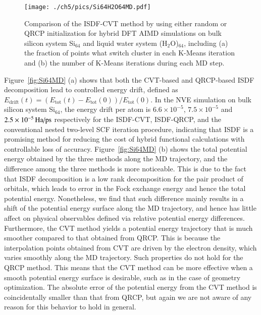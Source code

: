 \begin{figure}[htbp]
	\begin{center}
		\texttt{[image: ./ch5/pics/Si64H2O64MD.pdf]}
	\end{center}
	\caption{Comparison of the ISDF-CVT method by using either random or
	QRCP initialization for hybrid DFT AIMD simulations on bulk silicon
	system Si$_{64}$ and liquid water system (H$_2$O)$_{64}$, including
	(a) the fraction of points what switch cluster in each K-Means
	iteration and (b) the number of K-Means iterations during each MD
	step.}\label{fig:Si64H2O64MD}
\end{figure}

Figure~\ref{fig:Si64MD} (a) shows that both the CVT-based and QRCP-based ISDF
decomposition lead to controlled energy drift, defined as $E_{\mathrm{drift}}(t)
= (E_{\mathrm{tot}}(t)- E_{\mathrm{tot}}(0))/E_{\mathrm{tot}}(0)$. In the NVE
simulation on bulk silicon system Si$_{64}$, the energy drift per atom is $6.6
\times 10^{-5}$, $7.5 \times 10^{-5}$ and $2.5 \times 10^{-5}\HaPps$
respectively for the ISDF-CVT, ISDF-QRCP, and the conventional nested two-level
SCF iteration procedure, indicating that ISDF is a promising method for
reducing the cost of hybrid functional calculations with controllable loss of
accuracy. Figure~\ref{fig:Si64MD} (b) shows the total potential energy obtained
by the three methods along the MD trajectory, and the difference among the three
methods is more noticeable. This is due to the fact that ISDF decomposition is a
low rank decomposition for the pair product of orbitals, which leads to error in
the Fock exchange energy and hence the total potential energy. Nonetheless, we
find that such difference mainly results in a shift of the potential energy
surface along the MD trajectory, and hence has little affect on physical
observables defined via relative potential energy differences. Furthermore, the
CVT method yields a potential energy trajectory that is much smoother compared
to that obtained from QRCP. This is because the interpolation points obtained
from CVT are driven by the electron density, which varies smoothly along the MD
trajectory. Such properties do not hold for the QRCP method. This means that the
CVT method can be more effective when a smooth potential energy surface is
desirable, such as in the case of geometry optimization. The absolute error of
the potential energy from the CVT method is coincidentally smaller than that
from QRCP, but again we are not aware of any reason for this behavior to hold in
general.

